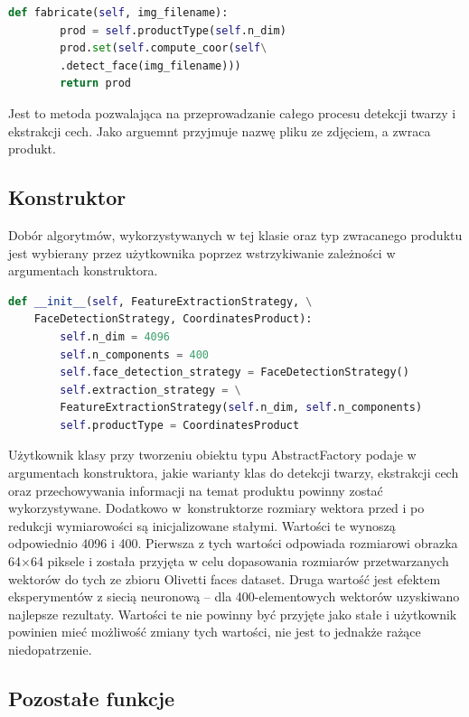 \documentclass[oneside, eng]{mgr}
\begin{document}
\begin{lstlisting}[language=Python]
    def fabricate(self, img_filename):
        prod = self.productType(self.n_dim)
        prod.set(self.compute_coor(self\
        .detect_face(img_filename)))
        return prod
\end{lstlisting}

Jest to metoda pozwalająca na przeprowadzanie całego procesu detekcji twarzy i ekstrakcji cech. Jako arguemnt przyjmuje nazwę pliku ze zdjęciem, a zwraca produkt.

\subsection{Konstruktor}

Dobór algorytmów, wykorzystywanych w tej klasie oraz typ zwracanego produktu jest wybierany przez użytkownika poprzez wstrzykiwanie zależności w argumentach konstruktora.

\begin{lstlisting}[language=Python]
    def __init__(self, FeatureExtractionStrategy, \
    FaceDetectionStrategy, CoordinatesProduct):
        self.n_dim = 4096
        self.n_components = 400
        self.face_detection_strategy = FaceDetectionStrategy()
        self.extraction_strategy = \
        FeatureExtractionStrategy(self.n_dim, self.n_components)
        self.productType = CoordinatesProduct
\end{lstlisting}

Użytkownik klasy przy tworzeniu obiektu typu AbstractFactory podaje w argumentach konstruktora, jakie warianty klas do detekcji twarzy, ekstrakcji cech oraz przechowywania informacji na temat produktu powinny zostać wykorzystywane. Dodatkowo w~konstruktorze rozmiary wektora przed i po redukcji wymiarowości są inicjalizowane stałymi. Wartości te wynoszą odpowiednio 4096 i 400. Pierwsza z tych wartości odpowiada rozmiarowi obrazka 64$\times$64 piksele i została przyjęta w celu dopasowania rozmiarów przetwarzanych wektorów do tych ze zbioru Olivetti faces dataset. Druga wartość jest efektem eksperymentów z siecią neuronową -- dla 400-elementowych wektorów uzyskiwano najlepsze rezultaty. Wartości te nie powinny być przyjęte jako stałe i użytkownik powinien mieć możliwość zmiany tych wartości, nie jest to jednakże rażące niedopatrzenie.

\subsection{Pozostałe funkcje}
\end{document}
